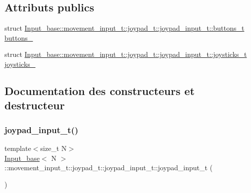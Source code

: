 \subsection*{Attributs publics}
\begin{DoxyCompactItemize}
\item 
struct \hyperlink{struct_input__base_1_1movement__input__t_1_1joypad__t_1_1joypad__input__t_1_1buttons__t}{Input\+\_\+base\+::movement\+\_\+input\+\_\+t\+::joypad\+\_\+t\+::joypad\+\_\+input\+\_\+t\+::buttons\+\_\+t} \hyperlink{union_input__base_1_1movement__input__t_1_1joypad__t_1_1joypad__input__t_a1f7535859a826ed9dbfa4f2d26b2f96f}{buttons\+\_\+}
\item 
struct \hyperlink{struct_input__base_1_1movement__input__t_1_1joypad__t_1_1joypad__input__t_1_1joysticks__t}{Input\+\_\+base\+::movement\+\_\+input\+\_\+t\+::joypad\+\_\+t\+::joypad\+\_\+input\+\_\+t\+::joysticks\+\_\+t} \hyperlink{union_input__base_1_1movement__input__t_1_1joypad__t_1_1joypad__input__t_a1d99d1002402eb45d0d4593a8fddca19}{joysticks\+\_\+}
\end{DoxyCompactItemize}


\subsection{Documentation des constructeurs et destructeur}
\mbox{\label{union_input__base_1_1movement__input__t_1_1joypad__t_1_1joypad__input__t_aecc82d9f657e0b3b88040f690d62df30}} 
\subsubsection{\texorpdfstring{joypad\+\_\+input\+\_\+t()}{joypad\_input\_t()}}
{\footnotesize\ttfamily template$<$size\+\_\+t N$>$ \\
\hyperlink{class_input__base}{Input\+\_\+base}$<$ N $>$\+::movement\+\_\+input\+\_\+t\+::joypad\+\_\+t\+::joypad\+\_\+input\+\_\+t\+::joypad\+\_\+input\+\_\+t (\begin{DoxyParamCaption}{ }\end{DoxyParamCaption})\hspace{0.3cm}{\ttfamily [inline]}}



